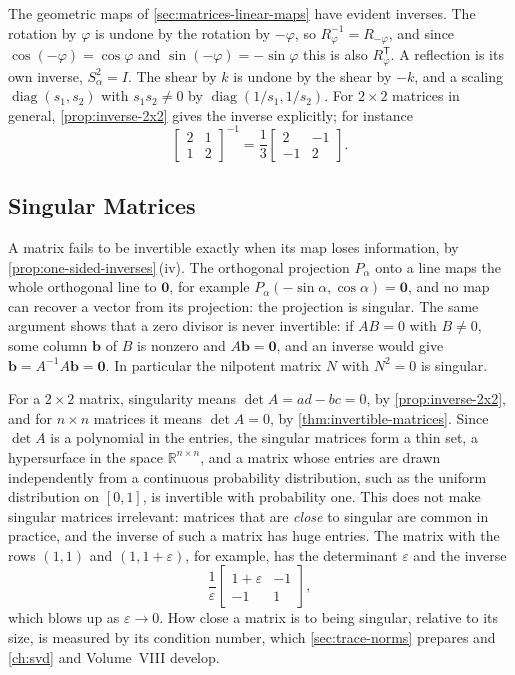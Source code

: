 The geometric maps of \cref{sec:matrices-linear-maps} have evident inverses. The rotation by $\varphi$ is undone by the rotation by $-\varphi$, so $R_\varphi^{-1}=R_{-\varphi}$, and since $\cos(-\varphi)=\cos\varphi$ and $\sin(-\varphi)=-\sin\varphi$ this is also $R_\varphi^{\mathsf T}$. A reflection is its own inverse, $S_\alpha^2=I$. The shear by $k$ is undone by the shear by $-k$, and a scaling $\operatorname{diag}(s_1,s_2)$ with $s_1s_2\ne0$ by $\operatorname{diag}(1/s_1,1/s_2)$. For $2\times2$ matrices in general, \cref{prop:inverse-2x2} gives the inverse explicitly; for instance
\[
\begin{bmatrix}2&1\\1&2\end{bmatrix}^{-1}=\frac13\begin{bmatrix}2&-1\\-1&2\end{bmatrix}.
\]

\subsection{Singular Matrices}

A matrix fails to be invertible exactly when its map loses information, by \cref{prop:one-sided-inverses}\,(iv). The orthogonal projection $P_\alpha$ onto a line maps the whole orthogonal line to $\mathbf 0$, for example $P_\alpha(-\sin\alpha,\cos\alpha)=\mathbf 0$, and no map can recover a vector from its projection: the projection is singular. The same argument shows that a zero divisor is never invertible: if $AB=0$ with $B\ne0$, some column $\mathbf b$ of $B$ is nonzero and $A\mathbf b=\mathbf 0$, and an inverse would give $\mathbf b=A^{-1}A\mathbf b=\mathbf 0$. In particular the nilpotent matrix $N$ with $N^2=0$ is singular.

For a $2\times2$ matrix, singularity means $\det A=ad-bc=0$, by \cref{prop:inverse-2x2}, and for $n\times n$ matrices it means $\det A=0$, by \cref{thm:invertible-matrices}. Since $\det A$ is a polynomial in the entries, the singular matrices form a thin set, a hypersurface in the space $\mathbb R^{n\times n}$, and a matrix whose entries are drawn independently from a continuous probability distribution, such as the uniform distribution on $[0,1]$, is invertible with probability one. This does not make singular matrices irrelevant: matrices that are \emph{close} to singular are common in practice, and the inverse of such a matrix has huge entries. The matrix with the rows $(1,1)$ and $(1,1+\varepsilon)$, for example, has the determinant $\varepsilon$ and the inverse
\[
\frac1\varepsilon\begin{bmatrix}1+\varepsilon&-1\\-1&1\end{bmatrix},
\]
which blows up as $\varepsilon\to0$. How close a matrix is to being singular, relative to its size, is measured by its condition number, which \cref{sec:trace-norms} prepares and \cref{ch:svd} and Volume~VIII develop.

